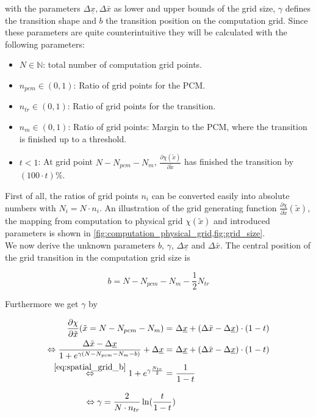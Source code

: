 \documentclass{scrartcl}[12pt, halfparskip]
\numberwithin{equation}{section}
\numberwithin{figure}{section}
\numberwithin{table}{section}
\begin{document}
with the parameters $\Delta \underline{x}, \Delta \bar{x}$ as lower and upper bounds of the grid size, $\gamma$ defines the transition shape and $b$ the transition position on the computation grid. Since these parameters are quite counterintuitive they will be calculated with the following parameters:

\begin{itemize}
	\item $N \in \mathbb{N}$: total number of computation grid points.
	\item $n_{pcm} \in (0,1)$: Ratio of grid points for the PCM.
	\item $n_{tr} \in (0,1)$: Ratio of grid points for the transition.
	\item $n_{m} \in (0,1)$: Ratio of grid points: Margin to the PCM, where the transition is finished up to a threshold.
	\item $t < 1$: At grid point $N-N_{pcm}-N_m$, $\frac{\partial \chi(\tilde{x})}{\partial \tilde{x}}$ has finished the transition by $(100 \cdot t)\%$.
\end{itemize}

First of all, the ratios of grid points $n_i$ can be converted easily into absolute numbers with $N_i = N \cdot n_i$. An illustration of the grid generating function $\frac{\partial \chi}{\partial \tilde{x}}(\tilde{x})$, the mapping from computation to physical grid $\chi(\tilde{x})$ and introduced parameters is shown in \cref{fig:computation_physical_grid,fig:grid_size}. \\
We now derive the unknown parameters $b$, $\gamma$, $\Delta \underline{x}$ and $\Delta \bar{x}$. The central position of the grid transition in the computation grid size is

\begin{equation}
	b = N - N_{pcm} - N_m - \frac{1}{2} N_{tr}
	\label{eq:spatial_grid_b}
\end{equation}

Furthermore we get $\gamma$ by

\begin{subequations}
\begin{align}
	\frac{\partial \chi}{\partial \tilde{x}}(\tilde{x}=N-N_{pcm}-N_m) = \ & \Delta \underline{x} + (\Delta \bar{x} - \Delta \underline{x}) \cdot (1-t) \\
	\Leftrightarrow \frac{\Delta \bar{x} - \Delta \underline{x}}{1 + e^{\gamma(N-N_{pcm}-N_m - b)}} + \Delta \underline{x} = \ & \Delta \underline{x} + (\Delta \bar{x} - \Delta \underline{x}) \cdot (1-t)  \\
	\stackrel{\cref{eq:spatial_grid_b}}{\Leftrightarrow}  1 + e^{\gamma \frac{N_{tr}}{2}} = \ & \frac{1}{1 - t}  \\[2ex]
	\Leftrightarrow \gamma = \frac{2}{N \cdot n_{tr}} \ln(\frac{t}{1-t})
\end{align}
\end{subequations}
\end{document}
